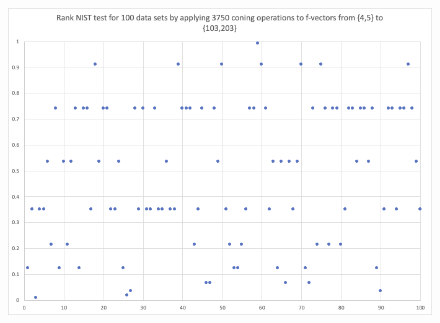 \documentclass[oneside,12pt]{amsart}
\theoremstyle{definition}
\numberwithin{equation}{section}
\begin{document}
\begin{figure}[h!]
\centering
\includegraphics[scale=.5]{./charts/Rank_4_5.png}
\label{fig:rank45}
\end{figure}
\end{document}
